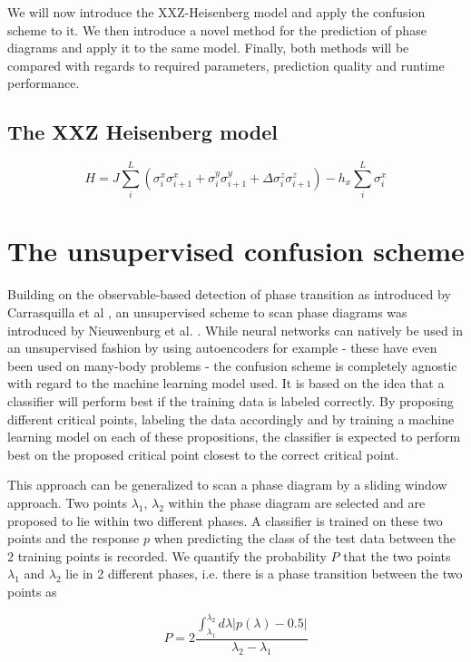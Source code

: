 \documentclass[prl, reprint, twocolumn]{revtex4-1}
\begin{document}
	We will now introduce the XXZ-Heisenberg model and apply the confusion scheme to it. We then introduce a novel method for the prediction of phase diagrams and apply it to the same model. Finally, both methods will be compared with regards to required parameters, prediction quality and runtime performance.
	
	
	
	\subsection{The XXZ Heisenberg model}
	\begin{equation}
	H = J\sum_i^L\left(\sigma^x_i\sigma^x_{i+1}+\sigma^y_i\sigma^y_{i+1}+\Delta\sigma^z_i\sigma^z_{i+1}\right) - h_x\sum_i^L\sigma^x_i
	\label{eq:xxz}
	\end{equation}
	
	
	\section{The unsupervised confusion scheme}
	Building on the observable-based detection of phase transition as introduced by Carrasquilla et al \cite{Carrasquilla2017}, an unsupervised scheme to scan phase diagrams was introduced by Nieuwenburg et al. \cite{Nieuwenburg2017}.
	While neural networks can natively be used in an unsupervised fashion by using autoencoders for example - these have even been used on many-body problems \cite{Wetzel2017} - the confusion scheme is completely agnostic with regard to the machine learning model used. It is based on the idea that a classifier will perform best if the training data is labeled correctly. By proposing different critical points, labeling the data accordingly and by training a machine learning model on each of these propositions, the classifier is expected to perform best on the proposed critical point closest to the correct critical point.
	
	This approach can be generalized to scan a phase diagram by a sliding window approach\cite{Broecker2017}. Two points $\lambda_1$, $\lambda_2$ within the phase diagram are selected and are proposed to lie within two different phases. A classifier is trained on these two points and the response $p$ when predicting the class of the test data between the 2 training points is recorded. We quantify the probability $P$ that the two points $\lambda_1$ and $\lambda_2$ lie in 2 different phases, i.e. there is a phase transition between the two points as
	
	\begin{equation}
	P = 2\frac{\int_{\lambda_1}^{\lambda_2} d\lambda |p(\lambda) - 0.5|}{\lambda_2-\lambda_1}
	\label{eq:P}
	\end{equation}
	
\end{document}
